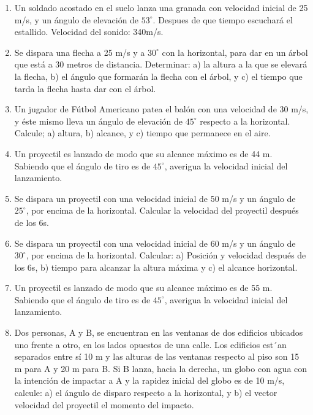 \documentclass[a5paper,pagesize,10pt,bibtotoc,pointlessnumbers,
normalheadings,DIV=9,fleqn,x11names,table,twoside=false]{scrbook}
\begin{document}
\begin{enumerate}

 \item Un soldado acostado en el suelo lanza una granada con velocidad inicial de 25 m/s, y un ángulo de elevación de
 $53^\circ$. Despues de que tiempo escuchará el estallido. Velocidad del sonido: 340m/s.
 
 \item Se dispara una flecha a 25 m/s y a $30^\circ$ con la horizontal,
 para dar en un árbol que está a 30 metros de distancia. 
Determinar: a) la altura a la que se elevará
 la flecha,  b) el ángulo que formarán la
 flecha con el árbol, y c) el tiempo que 
tarda la flecha hasta dar con el árbol. 


\item Un jugador de Fútbol Americano patea el balón con una velocidad de 30 m/s, y éste mismo
 lleva un ángulo de elevación de 
$45^\circ
$ respecto a la horizontal. Calcule; a) altura, b) alcance, y c) tiempo que
 permanece en el aire.

\item  Un proyectil es lanzado de modo que su alcance máximo
 es de 44 m. Sabiendo que el ángulo de tiro es de $45^\circ$, 
averigua la velocidad inicial del
 lanzamiento. 

\item Se dispara un proyectil con una velocidad inicial de 50 m/s
 y un ángulo de $25^\circ$, por encima de la horizontal. 
Calcular la velocidad del proyectil después de
 los 6s.

\item Se dispara un proyectil con una velocidad inicial de 60 m/s y un ángulo de $30^\circ
$, por encima de
 la horizontal. 
Calcular: a) Posición y velocidad después de los 6s, b) tiempo para alcanzar la altura máxima
 y c) el  alcance horizontal.

\item  Un proyectil es lanzado de modo que su alcance máximo
 es de 55 m. Sabiendo que el ángulo de tiro es de $45^\circ$, 
averigua la velocidad inicial del
 lanzamiento. 

\item Dos personas, A y B, se encuentran en las ventanas de dos edificios ubicados uno frente a
 otro, en los lados opuestos de 
una calle. Los edificios est´an separados entre sí 10 m y las alturas de las
 ventanas respecto al piso son 15 m para A y 20 m 
para B. Si B lanza, hacia la derecha, un globo con agua
 con la intención de impactar a A y la rapidez inicial del globo es de 
10 m/s, calcule: a) el ángulo de disparo
 respecto a la horizontal, y b) el vector velocidad del proyectil el momento del impacto.

\end{enumerate}
\end{document}
